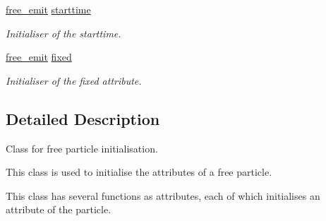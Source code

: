 \begin{DoxyCompactItemize}
\mbox{\label{classphysim_1_1emitters_1_1free__emitter_af296f735438087c4acaba2242c839e49}} 
\hyperlink{namespacephysim_1_1emitters_a68725a630c2e0c1b4cdff4ca0ee174ac}{free\+\_\+emit} \hyperlink{classphysim_1_1emitters_1_1free__emitter_af296f735438087c4acaba2242c839e49}{starttime}
\begin{DoxyCompactList}\small\item\em Initialiser of the starttime. \end{DoxyCompactList}\item 
\mbox{\label{classphysim_1_1emitters_1_1free__emitter_a2561dbe073b699e28fbb7ad10e897567}} 
\hyperlink{namespacephysim_1_1emitters_a68725a630c2e0c1b4cdff4ca0ee174ac}{free\+\_\+emit} \hyperlink{classphysim_1_1emitters_1_1free__emitter_a2561dbe073b699e28fbb7ad10e897567}{fixed}
\begin{DoxyCompactList}\small\item\em Initialiser of the \textquotesingle{}fixed\textquotesingle{} attribute. \end{DoxyCompactList}\end{DoxyCompactItemize}


\subsection{Detailed Description}
Class for free particle initialisation. 

This class is used to initialise the attributes of a free particle.

This class has several functions as attributes, each of which initialises an attribute of the particle.

